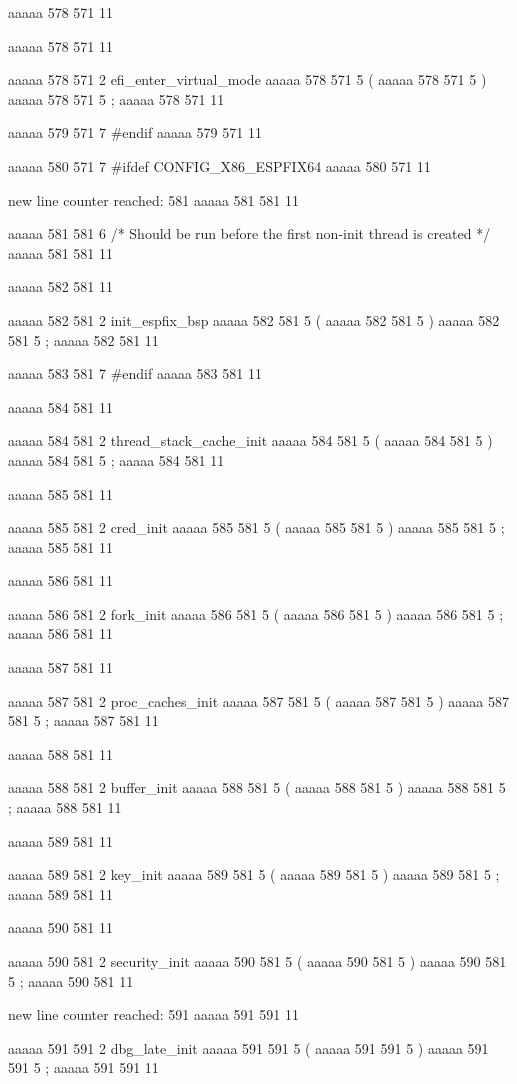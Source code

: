 {aaaaa 578 571
11
	
aaaaa 578 571
11
	
aaaaa 578 571
2
efi_enter_virtual_mode
aaaaa 578 571
5
(
aaaaa 578 571
5
)
aaaaa 578 571
5
;
aaaaa 578 571
11


aaaaa 579 571
7
#endif
aaaaa 579 571
11


aaaaa 580 571
7
#ifdef CONFIG_X86_ESPFIX64
aaaaa 580 571
11


new line counter reached: 581
aaaaa 581 581
11
	
aaaaa 581 581
6
/* Should be run before the first non-init thread is created */
aaaaa 581 581
11


aaaaa 582 581
11
	
aaaaa 582 581
2
init_espfix_bsp
aaaaa 582 581
5
(
aaaaa 582 581
5
)
aaaaa 582 581
5
;
aaaaa 582 581
11


aaaaa 583 581
7
#endif
aaaaa 583 581
11


aaaaa 584 581
11
	
aaaaa 584 581
2
thread_stack_cache_init
aaaaa 584 581
5
(
aaaaa 584 581
5
)
aaaaa 584 581
5
;
aaaaa 584 581
11


aaaaa 585 581
11
	
aaaaa 585 581
2
cred_init
aaaaa 585 581
5
(
aaaaa 585 581
5
)
aaaaa 585 581
5
;
aaaaa 585 581
11


aaaaa 586 581
11
	
aaaaa 586 581
2
fork_init
aaaaa 586 581
5
(
aaaaa 586 581
5
)
aaaaa 586 581
5
;
aaaaa 586 581
11


aaaaa 587 581
11
	
aaaaa 587 581
2
proc_caches_init
aaaaa 587 581
5
(
aaaaa 587 581
5
)
aaaaa 587 581
5
;
aaaaa 587 581
11


aaaaa 588 581
11
	
aaaaa 588 581
2
buffer_init
aaaaa 588 581
5
(
aaaaa 588 581
5
)
aaaaa 588 581
5
;
aaaaa 588 581
11


aaaaa 589 581
11
	
aaaaa 589 581
2
key_init
aaaaa 589 581
5
(
aaaaa 589 581
5
)
aaaaa 589 581
5
;
aaaaa 589 581
11


aaaaa 590 581
11
	
aaaaa 590 581
2
security_init
aaaaa 590 581
5
(
aaaaa 590 581
5
)
aaaaa 590 581
5
;
aaaaa 590 581
11


new line counter reached: 591
aaaaa 591 591
11
	
aaaaa 591 591
2
dbg_late_init
aaaaa 591 591
5
(
aaaaa 591 591
5
)
aaaaa 591 591
5
;
aaaaa 591 591
11


}
